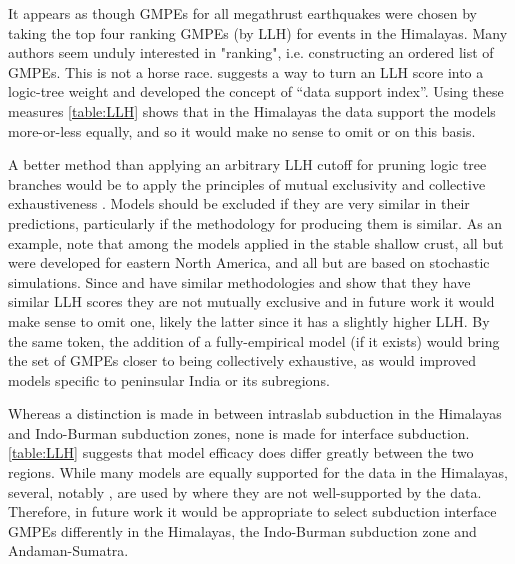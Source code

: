 \documentclass{article}
\begin{document}
\begin{appendices}
It appears as though GMPEs for all megathrust earthquakes were chosen by taking the top four ranking GMPEs (by LLH) for events in the Himalayas. 
Many authors \citep{scherbaum2009model, nath2011peak, delavaud2012toward, anbazhagan2015selection} seem unduly interested in "ranking", i.e. constructing an ordered list of GMPEs.
This is not a horse race.
\cite{scherbaum2009model} suggests a way to turn an LLH score into a logic-tree weight and \cite{delavaud2012testing} developed the concept of ``data support index''.
Using these measures \autoref{table:LLH} shows that in the Himalayas the data support the models more-or-less equally, and so it would make no sense to omit \cite{youngs1997strong} or \cite{lin2008ground} on this basis.

A better method than applying an arbitrary LLH cutoff for pruning logic tree branches would be to apply the principles of mutual exclusivity and collective exhaustiveness \cite{scherbaum2009model}. 
Models should be excluded if they are very similar in their predictions, particularly if the methodology for producing them is similar. 
As an example, note that among the models applied in the stable shallow crust, all but \cite{raghukanth2007estimation} were developed for eastern North America, and all but \cite{campbell2003prediction} are based on stochastic simulations. 
Since \cite{atkinson2006earthquake} and \cite{toro2002modification} have similar methodologies and \cite{nath2011peak} show that they have similar LLH scores they are not mutually exclusive and in future work it would make sense to omit one, likely the latter since it has a slightly higher LLH. 
By the same token, the addition of a fully-empirical model (if it exists) would bring the set of GMPEs closer to being collectively exhaustive, as would improved models specific to peninsular India or its subregions.

Whereas a distinction is made in \cite{nath2012probabilistic} between intraslab subduction in the Himalayas and Indo-Burman subduction zones, none is made for interface subduction. 
\autoref{table:LLH} suggests that model efficacy does differ greatly between the two regions. 
While many models are equally supported for the data in the Himalayas, several, notably \cite{kanno2006new}, are used by \cite{nath2012probabilistic} where they are not well-supported by the data. 
Therefore, in future work it would be appropriate to select subduction interface GMPEs differently in the Himalayas, the Indo-Burman subduction zone and Andaman-Sumatra.


\end{appendices}
\end{document}
